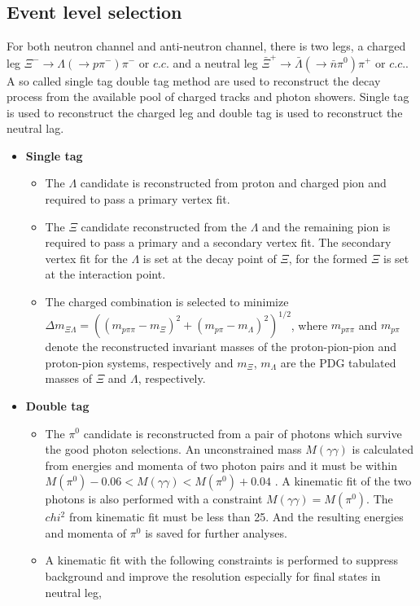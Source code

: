\subsection{Event level selection}
For both neutron channel and anti-neutron channel, there is two legs, a charged leg 
$\Xi^- \to \Lambda(\to p\pi^-) \pi^-$ or $c.c.$ and a neutral leg
$\bar{\Xi}^+ \to \bar{\Lambda} (\to \bar{n} \pi^0)\pi^+$ or $c.c.$.
A so called single tag double tag method are used to reconstruct the decay process 
from the available pool of charged tracks and photon showers. Single tag is used to 
reconstruct the charged leg and double tag is used to reconstruct the neutral lag.
\begin{itemize}
	\item {\bf Single tag}
		\begin{itemize}
			\item The $\Lambda$ candidate is reconstructed from proton 
				and charged pion and required to pass a primary 
				vertex fit. 
			\item The $\Xi$ candidate reconstructed from the $\Lambda$
				and the remaining pion is required to pass a primary
				and a secondary vertex fit. The secondary vertex fit
				for the $\Lambda$ is set at the decay point of $\Xi$, 
				for the formed $\Xi$ is set at the  interaction point.
			\item The charged combination is selected to minimize 
				$\Delta m_{\Xi \Lambda} = ((m_{p\pi\pi} - m_{\Xi})^2
				+ (m_{p\pi} - m_{\Lambda})^2)^{1/2}$, where $m_{p\pi\pi}$
				and $m_{p\pi}$ denote the reconstructed invariant masses
				of the proton-pion-pion and proton-pion systems, respectively
				and $m_{\Xi}$, $m_{\Lambda}$ are the PDG tabulated masses of 
				$\Xi$ and $\Lambda$, respectively.
		\end{itemize}
	\item {\bf Double tag}
		\begin{itemize}
			\item The $\pi^0$ candidate is reconstructed from a pair of photons
				which survive the good photon selections. An unconstrained 
				mass $M(\gamma\gamma)$ is calculated from energies and momenta
				of two photon pairs and it must be within $M(\pi^0) - 0.06 < 
				M(\gamma\gamma) < M(\pi^0) + 0.04 $
				. A kinematic fit of the two photons
				is also performed with a constraint $M(\gamma\gamma) = M(\pi^0)$.
				The $chi^2$ from kinematic fit must be less than 25.
				And the resulting energies and momenta of $\pi^0$ is saved for 
				further analyses.
			\item A kinematic fit with the following constraints is performed to suppress
				background and improve the resolution especially for final states in
				neutral leg,


\end{itemize}
\end{itemize}
